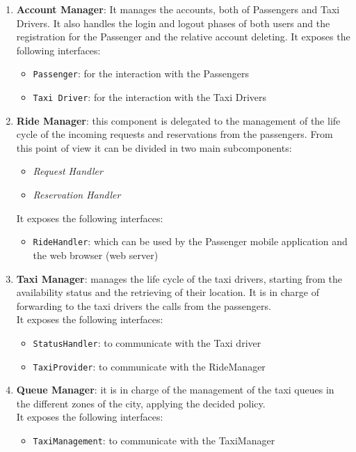 \begin{enumerate}
	\item \textbf{Account Manager}: It manages the accounts, both of Passengers and Taxi Drivers. It also handles the login and logout phases of both users and the registration for the Passenger and the relative account deleting. It exposes the following interfaces:
	\begin{itemize}
		\item \texttt{Passenger}: for the interaction with the Passengers
		\item \texttt{Taxi Driver}: for the interaction with the Taxi Drivers
	\end{itemize}
	\item \textbf{Ride Manager}: this component is delegated to the management of the life cycle of the incoming requests and reservations from the passengers. From this point of view it can be divided in two main subcomponents:
	\begin{itemize}
		\item \textit{Request Handler}
		\item \textit{Reservation Handler}
	\end{itemize}
	It exposes the following interfaces:
	\begin{itemize}
		\item \texttt{RideHandler}: which can be used by the Passenger mobile application and the web browser (web server)
	\end{itemize}
	\item \textbf{Taxi Manager}: manages the life cycle of the taxi drivers, starting from the availability status and the retrieving of their location. It is in charge of forwarding to the taxi drivers the calls from the passengers.\\ It exposes the following interfaces:
	\begin{itemize}
		\item \texttt{StatusHandler}: to communicate with the Taxi driver
		\item \texttt{TaxiProvider}: to communicate with the RideManager
	\end{itemize}
	\item \textbf{Queue Manager}: it is in charge of the management of the taxi queues in the different zones of the city, applying the decided policy.\\
	It exposes the following interfaces:
	\begin{itemize}
		\item \texttt{TaxiManagement}: to communicate with the TaxiManager

\end{itemize}
\end{enumerate}
